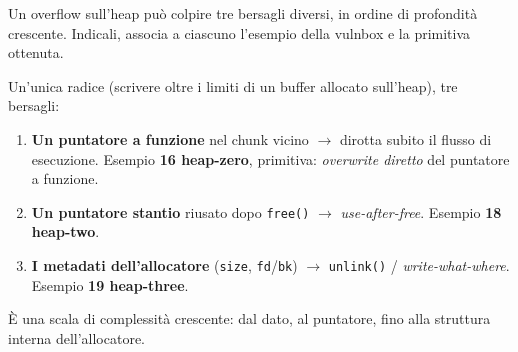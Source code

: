 \question[5]
Un overflow sull'heap può colpire tre bersagli diversi, in ordine di profondità crescente. Indicali, associa a ciascuno l'esempio della vulnbox e la primitiva ottenuta.
\begin{solution}
Un'unica radice (scrivere oltre i limiti di un buffer allocato sull'heap), tre bersagli:
\begin{enumerate}[leftmargin=*,nosep]
  \item \textbf{Un puntatore a funzione} nel chunk vicino $\to$ dirotta subito il flusso di esecuzione. Esempio \textbf{16 heap-zero}, primitiva: \emph{overwrite diretto} del puntatore a funzione.
  \item \textbf{Un puntatore stantio} riusato dopo \lstinline|free()| $\to$ \emph{use-after-free}. Esempio \textbf{18 heap-two}.
  \item \textbf{I metadati dell'allocatore} (\lstinline|size|, \lstinline|fd|/\lstinline|bk|) $\to$ \lstinline|unlink()| / \emph{write-what-where}. Esempio \textbf{19 heap-three}.
\end{enumerate}
È una scala di complessità crescente: dal dato, al puntatore, fino alla struttura interna dell'allocatore.
\end{solution}
